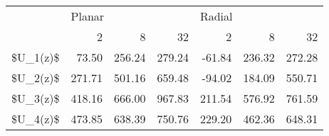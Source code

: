 \begin{tabular}{lrrrrrr}
\toprule
{} & \multicolumn{3}{l}{Planar} & \multicolumn{3}{l}{Radial} \\
{} &     2  &     8  &     32 &     2  &     8  &     32 \\
\midrule
\$U\_1(z)\$ &  73.50 & 256.24 & 279.24 & -61.84 & 236.32 & 272.28 \\
\$U\_2(z)\$ & 271.71 & 501.16 & 659.48 & -94.02 & 184.09 & 550.71 \\
\$U\_3(z)\$ & 418.16 & 666.00 & 967.83 & 211.54 & 576.92 & 761.59 \\
\$U\_4(z)\$ & 473.85 & 638.39 & 750.76 & 229.20 & 462.36 & 648.31 \\
\bottomrule
\end{tabular}
